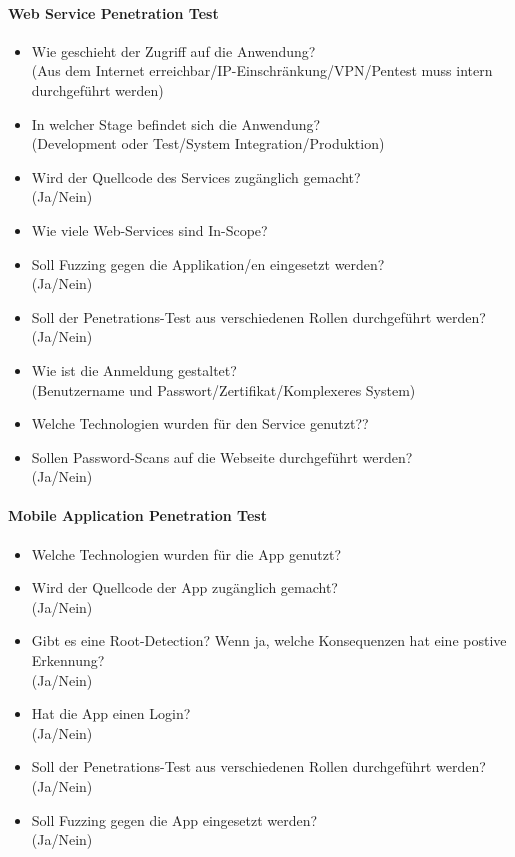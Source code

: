\paragraph{Web Service Penetration Test}
\begin{itemize}
	\item Wie geschieht der Zugriff auf die Anwendung?\\
	(Aus dem Internet erreichbar/IP-Einschränkung/VPN/Pentest muss intern durchgeführt werden)
	\item In welcher Stage befindet sich die Anwendung?\\
	(Development oder Test/System Integration/Produktion)
	\item Wird der Quellcode des Services zugänglich gemacht? \\
	(Ja/Nein)
	\item Wie viele Web-Services sind In-Scope?
	\item Soll Fuzzing gegen die Applikation/en eingesetzt werden?\\
	(Ja/Nein)
	\item Soll der Penetrations-Test aus verschiedenen Rollen durchgeführt werden?\\
	(Ja/Nein)
	\item  Wie ist die Anmeldung gestaltet?\\
	(Benutzername und Passwort/Zertifikat/Komplexeres System)
	\item Welche Technologien wurden für den Service genutzt??
	\item Sollen Password-Scans auf die Webseite durchgeführt werden?\\
	(Ja/Nein)
\end{itemize}

\paragraph{Mobile Application Penetration Test}
\begin{itemize}
	\item Welche Technologien wurden für die App genutzt?
	\item Wird der Quellcode der App zugänglich gemacht?\\
	(Ja/Nein)
	\item Gibt es eine Root-Detection? Wenn ja, welche Konsequenzen hat eine postive Erkennung?\\
	(Ja/Nein)
	\item Hat die App einen Login?\\
	(Ja/Nein)
	\item Soll der Penetrations-Test aus verschiedenen Rollen durchgeführt werden?\\
	(Ja/Nein)
	\item Soll Fuzzing gegen die App eingesetzt werden?\\
	(Ja/Nein)
\end{itemize}

